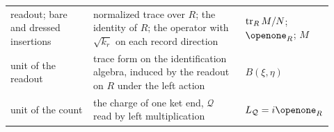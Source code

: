 \begin{table}[h]
\begin{ruledtabular}
\begin{tabular}{p{0.26\linewidth}p{0.48\linewidth}p{0.18\linewidth}}
readout; bare and dressed insertions & normalized trace over $R$; the identity of $R$; the operator with $\sqrt{k_{r}}$ on each record direction & $\operatorname{tr}_{R}M/N$; $\openone_{R}$; $M$ \\
unit of the readout & trace form on the identification algebra, induced by the readout on $R$ under the left action & $B(\xi,\eta)$ \\
unit of the count & the charge of one ket end, $\mathcal{Q}$ read by left multiplication & $L_{\mathcal{Q}}=i\openone_{R}$ \\
\end{tabular}
\end{ruledtabular}
\end{table}
